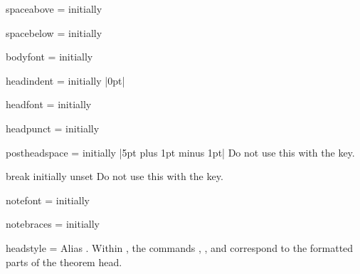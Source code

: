 \documentclass{ltxdoc}
\newcommand{\ttbraces}[1]{\braces{\texttt{#1}}}
\begin{document}
\begin{docKey}{spaceabove}
  {=}
  {initially }

\end{docKey}

\begin{docKey}{spacebelow}
  {=}
  {initially }

\end{docKey}

\begin{docKey}{bodyfont}
  {=}
  {initially }

\end{docKey}

\begin{docKey}{headindent}
  {=}
  {initially |0pt|}

\end{docKey}

\begin{docKey}{headfont}
  {=}
  {initially }

\end{docKey}

\begin{docKey}{headpunct}
  {=}
  {initially \ttbraces{.}}

\end{docKey}

\begin{docKey}{postheadspace}
  {=}
  {initially |5pt plus 1pt minus 1pt|}
Do not use this with the  key.
\end{docKey}

\begin{docKey}{break}
  {}
  {initially unset}
Do not use this with the  key.
\end{docKey}

\begin{docKey}{notefont}
  {=}
  {initially }

\end{docKey}

\begin{docKey}{notebraces}
  {=}
  {initially \ttbraces{(}\ttbraces{)}}

\end{docKey}

\begin{docKey}{headstyle}
  {=\textbar{}\textbar{}}
  {}
Alias . Within , the commands , , and  correspond to the formatted parts of the theorem head.
\end{docKey}
\end{document}
